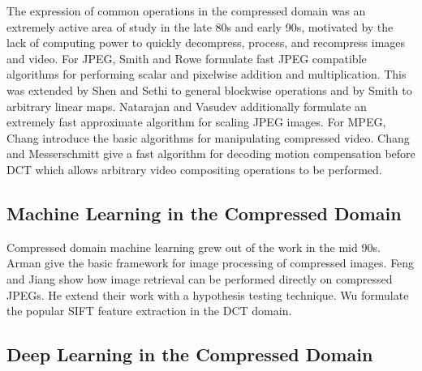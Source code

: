 \documentclass[10pt,twocolumn,letterpaper]{article}
\begin{document}
The expression of common operations in the compressed domain was an extremely active area of study in the late 80s and early 90s, motivated by the lack of computing power to quickly decompress, process, and recompress images and video. For JPEG, Smith and Rowe \cite{smith1993algorithms} formulate fast JPEG compatible algorithms for performing scalar and pixelwise addition and multiplication. This was extended by Shen and Sethi \cite{shen1995inner} to general blockwise operations and by Smith \cite{smith1994fast} to arbitrary linear maps. Natarajan and Vasudev \cite{natarajan1995fast} additionally formulate an extremely fast approximate algorithm for scaling JPEG images. For MPEG, Chang \etal\cite{chang1992video} introduce the basic algorithms for manipulating compressed video. Chang and Messerschmitt \cite{chang1993new} give a fast algorithm for decoding motion compensation before DCT which allows arbitrary video compositing operations to be performed. 

\subsection{Machine Learning in the Compressed Domain}

Compressed domain machine learning grew out of the work in the mid 90s. Arman \etal\cite{arman1993image} give the basic framework for image processing of compressed images. Feng and Jiang \cite{feng2002jpeg} show how image retrieval can be performed directly on compressed JPEGs. He \etal\cite{he2009efficient} extend their work with a hypothesis testing technique. Wu \etal\cite{wu2013sift} formulate the popular SIFT feature extraction in the DCT domain.

\subsection{Deep Learning in the Compressed Domain}
\end{document}
